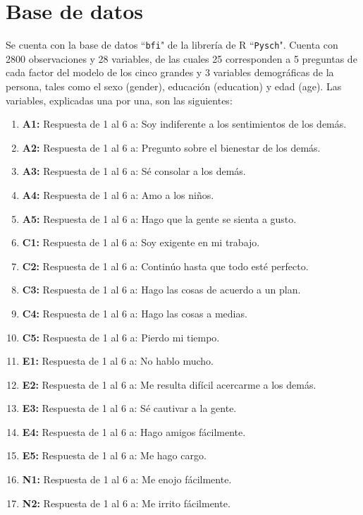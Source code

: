 \documentclass{report}
\begin{document}
\section{Base de datos}
Se cuenta con la base de datos ``\texttt{bfi}" de la librería de R ``\texttt{Pysch}". Cuenta con 2800 observaciones y 28 variables, de las cuales 25 corresponden a 5 preguntas de cada factor del modelo de los cinco grandes y 3 variables demográficas de la persona, tales como el sexo (gender), educación (education) y edad (age). Las variables, explicadas una por una, son las siguientes:\\
\begin{enumerate}
    \item \textbf{A1:} Respuesta de 1 al 6 a: Soy indiferente a los sentimientos de los demás.
    \item \textbf{A2:} Respuesta de 1 al 6 a: Pregunto sobre el bienestar de los demás.
    \item \textbf{A3:} Respuesta de 1 al 6 a: Sé consolar a los demás.
    \item \textbf{A4:} Respuesta de 1 al 6 a: Amo a los niños.
    \item \textbf{A5:} Respuesta de 1 al 6 a: Hago que la gente se sienta a gusto.
    \item \textbf{C1:} Respuesta de 1 al 6 a: Soy exigente en mi trabajo.
    \item \textbf{C2:} Respuesta de 1 al 6 a: Continúo hasta que todo esté perfecto.
    \item \textbf{C3:} Respuesta de 1 al 6 a: Hago las cosas de acuerdo a un plan.
    \item \textbf{C4:} Respuesta de 1 al 6 a: Hago las cosas a medias.
    \item \textbf{C5:} Respuesta de 1 al 6 a: Pierdo mi tiempo.
    \item \textbf{E1:} Respuesta de 1 al 6 a: No hablo mucho.
    \item \textbf{E2:} Respuesta de 1 al 6 a: Me resulta difícil acercarme a los demás.
    \item \textbf{E3:} Respuesta de 1 al 6 a: Sé cautivar a la gente.
    \item \textbf{E4:} Respuesta de 1 al 6 a: Hago amigos fácilmente.
    \item \textbf{E5:} Respuesta de 1 al 6 a: Me hago cargo.
    \item \textbf{N1:} Respuesta de 1 al 6 a: Me enojo fácilmente.
    \item \textbf{N2:} Respuesta de 1 al 6 a: Me irrito fácilmente.

\end{enumerate}
\end{document}
